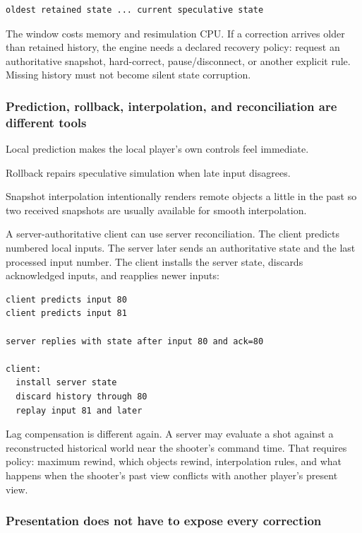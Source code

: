 \begin{verbatim}
oldest retained state ... current speculative state
\end{verbatim}

The window costs memory and resimulation CPU. If a correction arrives older than retained history, the engine needs a declared recovery policy: request an authoritative snapshot, hard-correct, pause/disconnect, or another explicit rule. Missing history must not become silent state corruption.

\subsubsection{Prediction, rollback, interpolation, and reconciliation are different tools}\label{06-engine-ii-ch047-prediction-rollback-interpolation-and-reconciliation-are-different-tools}

Local prediction makes the local player's own controls feel immediate.

Rollback repairs speculative simulation when late input disagrees.

Snapshot interpolation intentionally renders remote objects a little in the past so two received snapshots are usually available for smooth interpolation.

A server-authoritative client can use server reconciliation. The client predicts numbered local inputs. The server later sends an authoritative state and the last processed input number. The client installs the server state, discards acknowledged inputs, and reapplies newer inputs:

\begin{verbatim}
client predicts input 80
client predicts input 81

server replies with state after input 80 and ack=80

client:
  install server state
  discard history through 80
  replay input 81 and later
\end{verbatim}

Lag compensation is different again. A server may evaluate a shot against a reconstructed historical world near the shooter's command time. That requires policy: maximum rewind, which objects rewind, interpolation rules, and what happens when the shooter's past view conflicts with another player's present view.

\subsubsection{Presentation does not have to expose every correction}\label{06-engine-ii-ch047-presentation-does-not-have-to-expose-every-correction}

